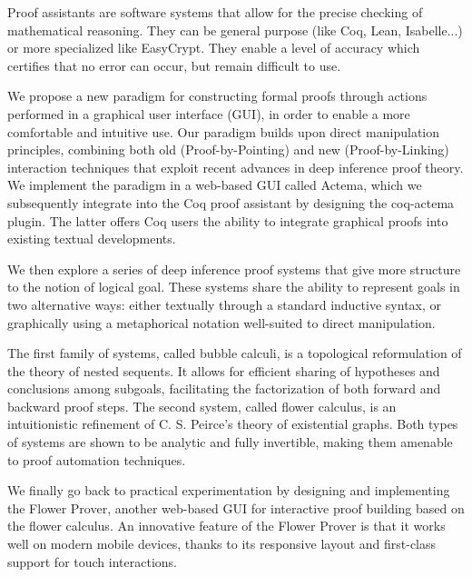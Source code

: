 Proof assistants are software systems that allow for the precise checking of
mathematical reasoning. They can be general purpose (like Coq, Lean,
Isabelle...) or more specialized like EasyCrypt. They enable a level of accuracy
which certifies that no error can occur, but remain difficult to use.

We propose a new paradigm for constructing formal proofs through actions
performed in a graphical user interface (GUI), in order to enable a more
comfortable and intuitive use. Our paradigm builds upon direct manipulation
principles, combining both old (Proof-by-Pointing) and new (Proof-by-Linking)
interaction techniques that exploit recent advances in deep inference proof
theory. We implement the paradigm in a web-based GUI called Actema, which we
subsequently integrate into the Coq proof assistant by designing the coq-actema
plugin. The latter offers Coq users the ability to integrate graphical proofs
into existing textual developments.

We then explore a series of deep inference proof systems that give more
structure to the notion of logical goal. These systems share the ability to
represent goals in two alternative ways: either textually through a standard
inductive syntax, or graphically using a metaphorical notation well-suited
to direct manipulation.

The first family of systems, called bubble calculi, is a topological
reformulation of the theory of nested sequents. It allows for efficient
sharing of hypotheses and conclusions among subgoals, facilitating the
factorization of both forward and backward proof steps. The second system,
called flower calculus, is an intuitionistic refinement of C. S. Peirce's
theory of existential graphs. Both types of systems are shown to be analytic
and fully invertible, making them amenable to proof automation techniques.

We finally go back to practical experimentation by designing and implementing
the Flower Prover, another web-based GUI for interactive proof building based on
the flower calculus. An innovative feature of the Flower Prover is that it works
well on modern mobile devices, thanks to its responsive layout and first-class
support for touch interactions.